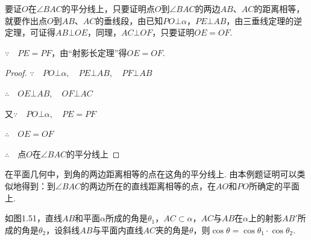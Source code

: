 \noindent
\begin{minipage}{.6\textwidth}
\begin{analyze}
    要证$O$在$\angle BAC$的平分线上，只要证明点$O$到$\angle BAC$的两边$AB$、$AC$的距离相等，就要作出点$O$到$AB$、$AC$的垂线段，由已知$PO\bot\alpha$，$PE\bot AB$，由三垂线定理的逆定理，可证得$AB\bot OE$，同理，$AC\bot OF$，只要证明$OE=OF$.

$\because\quad PE=PF$，由“射影长定理”得$OE=OF$.
\end{analyze}
\end{minipage}
\hfill
\begin{minipage}{.38\textwidth}
\centering
{}
\end{minipage}

\begin{proof}
$\because\quad PO\bot \alpha,\quad PE\bot AB,\quad PF\bot AB$

$\therefore\quad OE\bot AB,\quad OF\bot AC$

又$\because\quad PO\bot\alpha,\quad PE=PF$

$\therefore\quad OE=OF$

$\therefore\quad $点$O$在$\angle BAC$的平分线上
\end{proof}

\begin{remark}
在平面几何中，到角的两边距离相等的点在这角的平分线上. 由本例题证明可以类似地得到：到$\angle BAC$的两边所在的直线距离相等的点，在$AO$和$PO$所确定的平面上.
\end{remark}


\begin{example}
如图1.51，直线$AB$和平面$\alpha$所成的角是$\theta_1$，$AC\subset \alpha$，$AC$与$AB$在$\alpha$上的射影$AB'$所成的角是$\theta_2$，设斜线$AB$与平面内直线$AC$夹的角是$\theta$，则$\cos\theta=\cos\theta_1\cdot \cos\theta_2$.
\end{example}

